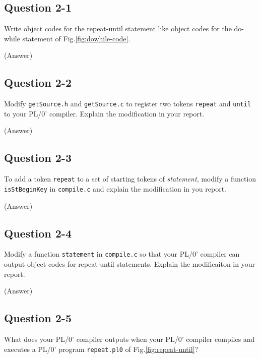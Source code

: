 \documentclass{article}
\begin{document}
\subsection*{Question 2-1}
Write object codes for the repeat-until statement 
like object codes for the do-while statement of Fig.\ref{fig:dowhile-code}.

\ifreport
(Answer)\\
\fi




\subsection*{Question 2-2}
Modify {\tt getSource.h} and {\tt getSource.c} to register two tokens
{\tt repeat} and {\tt until} to your PL/0' compiler.
Explain the modification in your report.

\ifreport
(Answer)\\
\fi



\subsection*{Question 2-3}
To add a token {\tt repeat} to a set of starting tokens of {\it statement},
modify a function {\tt isStBeginKey} in {\tt compile.c} and explain the modification in you report.

\ifreport
(Answer)\\
\fi



\subsection*{Question 2-4}
Modify a function {\tt statement} in {\tt compile.c}
so that your PL/0' compiler can output object codes for repeat-until statements.
Explain the modificaiton in your report.

\ifreport
(Answer)\\
\fi




\subsection*{Question 2-5}
What does your PL/0' compiler outputs when your PL/0' compiler compiles
and executes a PL/0' program {\tt repeat.pl0} of Fig.\ref{fig:repeat-until}?
\end{document}

